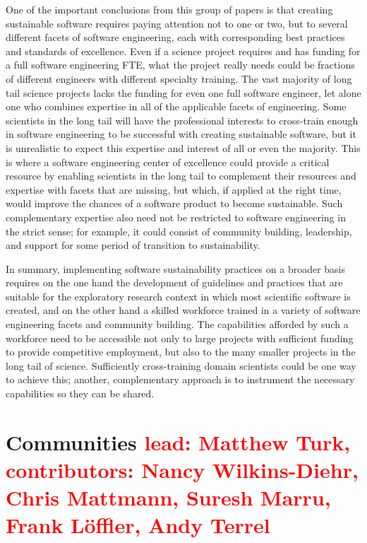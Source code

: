 \documentclass[11pt, oneside]{amsart}
\newcommand{\note}[1]{ {\textcolor{red}    { #1 }}}
\begin{document}
One of the important conclusions from this group of papers is that
creating sustainable software requires paying attention not to one or
two, but to several different facets of software engineering, each
with corresponding best practices and standards of excellence. Even if
a science project requires and has funding for a full software
engineering FTE, what the project really needs could be fractions of
different engineers with different specialty training. The vast
majority of long tail science projects lacks the funding for even one
full software engineer, let alone one who combines expertise in all of
the applicable facets of engineering. Some scientists in the long tail
will have the professional interests to cross-train enough in software
engineering to be successful with creating sustainable software, but
it is unrealistic to expect this expertise and interest of all or even
the majority. This is where a software engineering center of
excellence could provide a critical resource by enabling scientists in
the long tail to complement their resources and expertise with facets
that are missing, but which, if applied at the right time, would
improve the chances of a software product to become sustainable. Such
complementary expertise also need not be restricted to software
engineering in the strict sense; for example, it could consist of
community building, leadership, and support for some period of
transition to sustainability.

In summary, implementing software sustainability practices on a
broader basis requires on the one hand the development of guidelines
and practices that are suitable for the exploratory research context
in which most scientific software is created, and on the other hand a
skilled workforce trained in a variety of software engineering facets
and community building. The capabilities afforded by such a workforce
need to be accessible not only to large projects with sufficient
funding to provide competitive employment, but also to the many
smaller projects in the long tail of science. Sufficiently
cross-training domain scientists could be one way to achieve this;
another, complementary approach is to instrument the necessary
capabilities so they can be shared.

\section{Communities \note{\vspace{-1ex}\tiny lead: Matthew Turk, contributors: Nancy Wilkins-Diehr, Chris Mattmann, Suresh Marru, Frank L\"{o}ffler, Andy Terrel}} \label{sec:community}
\end{document}
